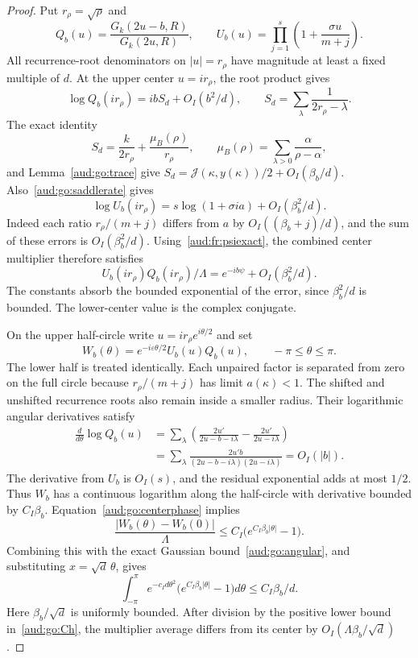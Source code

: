 \documentclass[11pt,a4paper]{article}
\numberwithin{equation}{section}
\begin{document}
\begin{proof}
Put $r_\rho=\sqrt\rho$ and
\[
 Q_b(u)=\frac{G_k(2u-b,R)}{G_k(2u,R)},\qquad
 U_b(u)=\prod_{j=1}^s\left(1+\frac{\sigma u}{m+j}\right).
\]
All recurrence-root denominators on $|u|=r_\rho$ have magnitude at least a fixed multiple of $d$. At the upper center $u=ir_\rho$, the root product gives
\[
 \log Q_b(ir_\rho)=ibS_d+O_I(b^2/d),\qquad
 S_d=\sum_\lambda\frac1{2r_\rho-\lambda}.
\]
The exact identity
\[
 S_d=\frac{k}{2r_\rho}+\frac{\mu_B(\rho)}{r_\rho},\qquad
 \mu_B(\rho)=\sum_{\lambda>0}\frac{\alpha}{\rho-\alpha},
\]
and Lemma~\ref{aud:go:trace} give
$S_d=\mathcal J(\kappa,y(\kappa))/2+O_I(\beta_b/d)$.
Also~\eqref{aud:go:saddlerate} gives
\[
 \log U_b(ir_\rho)=s\log(1+\sigma ia)+O_I(\beta_b^2/d).
\]
Indeed each ratio $r_\rho/(m+j)$ differs from $a$ by $O_I((\beta_b+j)/d)$, and the sum of these errors is $O_I(\beta_b^2/d)$. Using~\eqref{aud:fr:psiexact}, the combined center multiplier therefore satisfies
\begin{equation}\label{aud:go:centerphase}
 U_b(ir_\rho)Q_b(ir_\rho)/\Lambda
 =e^{-ib\psi}+O_I(\beta_b^2/d).
\end{equation}
The constants absorb the bounded exponential of the error, since $\beta_b^2/d$ is bounded. The lower-center value is the complex conjugate.

On the upper half-circle write $u=ir_\rho e^{i\theta/2}$ and set
\[
 W_b(\theta)=e^{-i\varepsilon\theta/2}U_b(u)Q_b(u),
 \qquad -\pi\le\theta\le\pi.
\]
The lower half is treated identically. Each unpaired factor is separated from zero on the full circle because $r_\rho/(m+j)$ has limit $a(\kappa)<1$. The shifted and unshifted recurrence roots also remain inside a smaller radius. Their logarithmic angular derivatives satisfy
\begin{align*}
 \frac{d}{d\theta}\log Q_b(u)
 &=\sum_\lambda\left(\frac{2u'}{2u-b-i\lambda}-\frac{2u'}{2u-i\lambda}\right)\\
 &=\sum_\lambda\frac{2u'b}{(2u-b-i\lambda)(2u-i\lambda)}
 =O_I(|b|).
\end{align*}
The derivative from $U_b$ is $O_I(s)$, and the residual exponential adds at most $1/2$. Thus $W_b$ has a continuous logarithm along the half-circle with derivative bounded by $C_I\beta_b$. Equation~\eqref{aud:go:centerphase} implies
\begin{equation}\label{aud:go:multiplierdiff}
 \frac{|W_b(\theta)-W_b(0)|}{\Lambda}
 \le C_I\bigl(e^{C_I\beta_b|\theta|}-1\bigr).
\end{equation}
Combining this with the exact Gaussian bound~\eqref{aud:go:angular}, and substituting $x=\sqrt d\,\theta$, gives
\begin{equation}\label{aud:go:integralerror}
 \int_{-\pi}^{\pi}e^{-c_I d\theta^2}
       \bigl(e^{C_I\beta_b|\theta|}-1\bigr)d\theta
 \le C_I\beta_b/d.
\end{equation}
Here $\beta_b/\sqrt d$ is uniformly bounded. After division by the positive lower bound in~\eqref{aud:go:Ch}, the multiplier average differs from its center by $O_I(\Lambda\beta_b/\sqrt d)$.


\end{proof}
\end{document}
